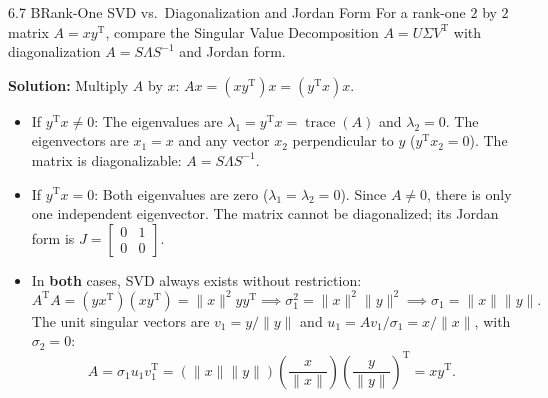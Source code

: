 \documentclass[11pt,a4paper,openany,oneside]{book}
\def\vect#1{#1}%
\def\mathbf#1{#1}%
\newcommand{\vect}[1]{\mathbf{#1}}
\newcommand{\T}{\mathrm{T}}
\numberwithin{equation}{chapter}
\begin{document}
\begin{example}{6.7 B}{Rank-One SVD vs.\ Diagonalization and Jordan Form}
For a rank-one $2$ by $2$ matrix $A = \vect{x}\vect{y}^\T$, compare the Singular Value Decomposition $A = U\Sigma V^\T$ with diagonalization $A = S\Lambda S^{-1}$ and Jordan form.
\end{example}
\textbf{Solution:} Multiply $A$ by $\vect{x}$: $A\vect{x} = (\vect{x}\vect{y}^\T)\vect{x} = (\vect{y}^\T\vect{x})\vect{x}$.
\begin{itemize}
\item If $\vect{y}^\T\vect{x} \neq 0$: The eigenvalues are $\lambda_1 = \vect{y}^\T\vect{x} = \operatorname{trace}(A)$ and $\lambda_2 = 0$. The eigenvectors are $\vect{x}_1 = \vect{x}$ and any vector $\vect{x}_2$ perpendicular to $\vect{y}$ ($\vect{y}^\T\vect{x}_2 = 0$). The matrix is diagonalizable: $A = S\Lambda S^{-1}$.
\item If $\vect{y}^\T\vect{x} = 0$: Both eigenvalues are zero ($\lambda_1 = \lambda_2 = 0$). Since $A \neq \vect{0}$, there is only one independent eigenvector. The matrix cannot be diagonalized; its Jordan form is $J = \begin{bmatrix} 0 & 1 \\ 0 & 0 \end{bmatrix}$.
\item In \textbf{both} cases, SVD always exists without restriction:
\[
A^\T A = (\vect{y}\vect{x}^\T)(\vect{x}\vect{y}^\T) = \|\vect{x}\|^2\vect{y}\vect{y}^\T \implies \sigma_1^2 = \|\vect{x}\|^2\|\vect{y}\|^2 \implies \sigma_1 = \|\vect{x}\|\|\vect{y}\|.
\]
The unit singular vectors are $\vect{v}_1 = \vect{y}/\|\vect{y}\|$ and $\vect{u}_1 = A\vect{v}_1/\sigma_1 = \vect{x}/\|\vect{x}\|$, with $\sigma_2 = 0$:
\[
A = \sigma_1\vect{u}_1\vect{v}_1^\T = (\|\vect{x}\|\|\vect{y}\|)\left(\frac{\vect{x}}{\|\vect{x}\|}\right)\left(\frac{\vect{y}}{\|\vect{y}\|}\right)^\T = \vect{x}\vect{y}^\T.
\]
\end{itemize}
\end{document}
